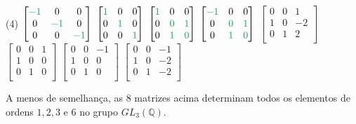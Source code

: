\documentclass[11pt,a4paper]{article}
\begin{document}
{\begin{tasks}[style=enumerate, item-format={\normalfont\tiny}, after-item-skip=4mm](4)
\task $\begin{bmatrix}
\textcolor{Green}{-1} & 0 & 0 \\
0 & \textcolor{Green}{-1} & 0 \\
0 & 0 & \textcolor{Green}{-1} \\
\end{bmatrix}$
\task $\begin{bmatrix}
\textcolor{Green}{1} & 0 & 0 \\
0 & \textcolor{Green}{1} & 0 \\
0 & 0 & \textcolor{Green}{1} \\
\end{bmatrix}$
\task $\begin{bmatrix}
\textcolor{Green}{1} & 0 & 0 \\
0 & \textcolor{Green}{0} & \textcolor{Green}{1} \\
0 & \textcolor{Green}{1} & \textcolor{Green}{0} \\
\end{bmatrix}$
\task $\begin{bmatrix}
\textcolor{Green}{-1} & 0 & 0 \\
0 & \textcolor{Green}{0} & \textcolor{Green}{1} \\
0 & \textcolor{Green}{1} & \textcolor{Green}{0} \\
\end{bmatrix}$
\task $\begin{bmatrix}
0 & 0 & 1 \\
1 & 0 & -2 \\
0 & 1 & 2 \\
\end{bmatrix}$
\task $\begin{bmatrix}
0 & 0 & 1 \\
1 & 0 & 0 \\
0 & 1 & 0 \\
\end{bmatrix}$
\task $\begin{bmatrix}
0 & 0 & -1 \\
1 & 0 & 0 \\
0 & 1 & 0 \\
\end{bmatrix}$
\task $\begin{bmatrix}
0 & 0 & -1 \\
1 & 0 & -2 \\
0 & 1 & -2 \\
\end{bmatrix}$
\end{tasks}
A menos de semelhança, as 8 matrizes acima determinam todos os elementos de ordens $1,2 , 3$ e $6$ no grupo $GL_3(\mathbb{Q}).$
}
\end{document}
